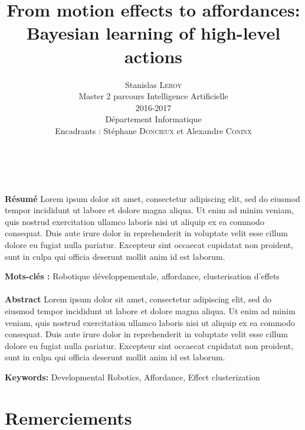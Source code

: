\documentclass[draft]{llncs}
\begin{document}
\title{From motion effects to affordances: Bayesian learning of high-level actions}

\author{Stanislas \textsc{Leroy}\\
   Master 2 parcours Intelligence Artificielle\\
   2016-2017\\
   Département Informatique\\
   Encadrants : Stéphane \textsc{Doncieux} et Alexandre \textsc{Coninx}}


\maketitle

\ \\\\\textbf{Résumé} Lorem ipsum dolor sit amet, consectetur adipiscing elit, sed do eiusmod tempor incididunt ut labore et dolore magna aliqua. Ut enim ad minim veniam, quis nostrud exercitation ullamco laboris nisi ut aliquip ex ea commodo consequat. Duis aute irure dolor in reprehenderit in voluptate velit esse cillum dolore eu fugiat nulla pariatur. Excepteur sint occaecat cupidatat non proident, sunt in culpa qui officia deserunt mollit anim id est laborum.

\textbf{Mots-clés :} Robotique développementale, affordance, clusterisation d'effets\\\\



\textbf{Abstract} Lorem ipsum dolor sit amet, consectetur adipiscing elit, sed do eiusmod tempor incididunt ut labore et dolore magna aliqua. Ut enim ad minim veniam, quis nostrud exercitation ullamco laboris nisi ut aliquip ex ea commodo consequat. Duis aute irure dolor in reprehenderit in voluptate velit esse cillum dolore eu fugiat nulla pariatur. Excepteur sint occaecat cupidatat non proident, sunt in culpa qui officia deserunt mollit anim id est laborum.

\textbf{Keywords:} Developmental Robotics, Affordance, Effect clusterization




\section*{Remerciements}
\end{document}
